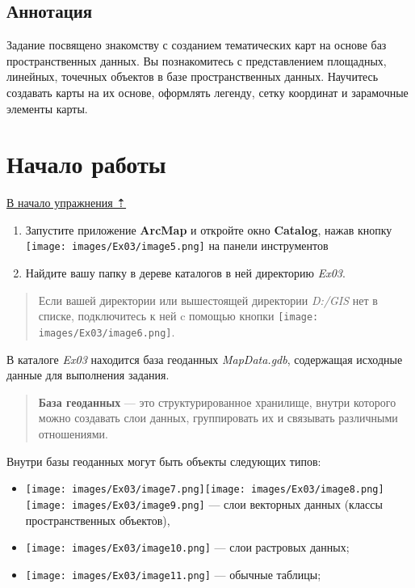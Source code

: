 \documentclass[12pt,]{book}
\providecommand{\tightlist}{%
  \setlength{\itemsep}{0pt}\setlength{\parskip}{0pt}}
\begin{document}
\hypertarget{map-design-climates-annotation}{%
\subsection{Аннотация}\label{map-design-climates-annotation}}

Задание посвящено знакомству с созданием тематических карт на основе баз
пространственных данных. Вы познакомитесь с представлением площадных,
линейных, точечных объектов в базе пространственных данных. Научитесь
создавать карты на их основе, оформлять легенду, сетку координат и
зарамочные элементы карты.

\hypertarget{map-design-climates-begin}{%
\section{Начало работы}\label{map-design-climates-begin}}

\protect\hyperlink{map-design-climates}{В начало упражнения ⇡}

\begin{enumerate}
\def\labelenumi{\arabic{enumi}.}
\item
  Запустите приложение \textbf{ArcMap} и откройте окно \textbf{Catalog}, нажав кнопку \texttt{[image: images/Ex03/image5.png]} на панели инструментов
\item
  Найдите вашу папку в дереве каталогов в ней директорию \emph{Ex03}.
\end{enumerate}

\begin{quote}
Если вашей директории или вышестоящей директории \emph{D:/GIS} нет в списке, подключитесь к ней c помощью кнопки \texttt{[image: images/Ex03/image6.png]}.
\end{quote}

В каталоге \emph{Ex03} находится база геоданных \emph{MapData.gdb}, содержащая
исходные данные для выполнения задания.

\begin{quote}
\textbf{База геоданных} --- это структурированное хранилище, внутри которого
можно создавать слои данных, группировать их и связывать различными
отношениями.
\end{quote}

Внутри базы геоданных могут быть объекты следующих типов:

\begin{itemize}
\tightlist
\item
  \texttt{[image: images/Ex03/image7.png]}\texttt{[image: images/Ex03/image8.png]}\texttt{[image: images/Ex03/image9.png]} --- слои векторных данных (классы пространственных объектов),
\item
  \texttt{[image: images/Ex03/image10.png]} --- слои растровых данных;
\item
  \texttt{[image: images/Ex03/image11.png]} --- обычные таблицы;
\end{itemize}
\end{document}
